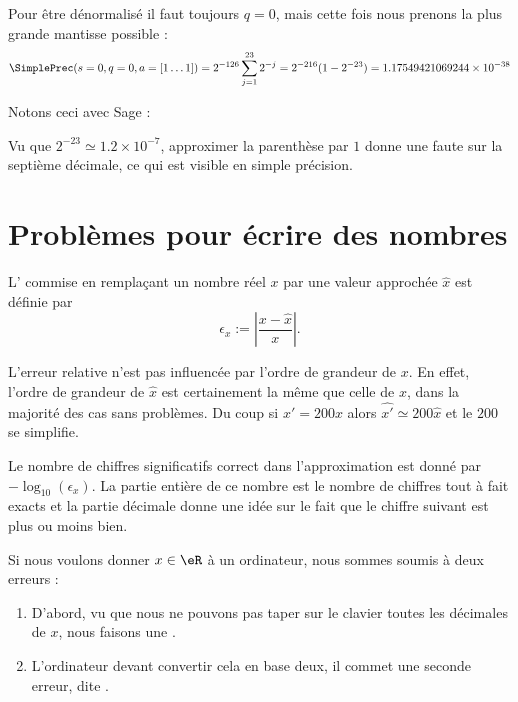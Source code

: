 \begin{example}      \label{EXEMooRHENooGwumoA}
    Pour être dénormalisé il faut toujours \( q=0\), mais cette fois nous prenons la plus grande mantisse possible :
    \begin{equation}
        \SimplePrec(s=0,q=0,a=[1\ldots 1])=2^{-126}\sum_{j=1}^{23}2^{-j}=2^{-216}(1-2^{-23})= 1.17549421069244\times 10^{-38}
    \end{equation}
\end{example}

Notons ceci avec Sage :


Vu que \( 2^{-23}\simeq 1.2\times 10^{-7}\), approximer la parenthèse par \( 1\) donne une faute sur la septième décimale, ce qui est visible en simple précision.

\section{Problèmes pour écrire des nombres}

\begin{definition}
	L' commise en remplaçant un nombre réel $x$ par une valeur approchée $\hat{x}$ est définie par
	\begin{equation}
		\epsilon_x:=\left|\frac{x-\hat{x}}{x}\right|.
	\end{equation}
\end{definition}

L'erreur relative n'est pas influencée par l'ordre de grandeur de \( x\). En effet, l'ordre de grandeur de \( \hat x\) est certainement la même que celle de \( x\), dans la majorité des cas sans problèmes. Du coup si \( x'=200x\) alors \( \hat{x'}\simeq 200\hat{x}\) et le \( 200\) se simplifie.

Le nombre de chiffres significatifs correct dans l'approximation est donné par \( -\log_{10}(\epsilon_x)\). La partie entière de ce nombre est le nombre de chiffres tout à fait exacts et la partie décimale donne une idée sur le fait que le chiffre suivant est plus ou moins bien.


\begin{remark}
	Si nous voulons donner \( x\in \eR\) à un ordinateur, nous sommes soumis à deux erreurs :
	\begin{enumerate}
		\item
			D'abord, vu que nous ne pouvons pas taper sur le clavier toutes les décimales de \( x\), nous faisons une .
		\item
			L'ordinateur devant convertir cela en base deux, il commet une seconde erreur, dite .
	\end{enumerate}
\end{remark}

